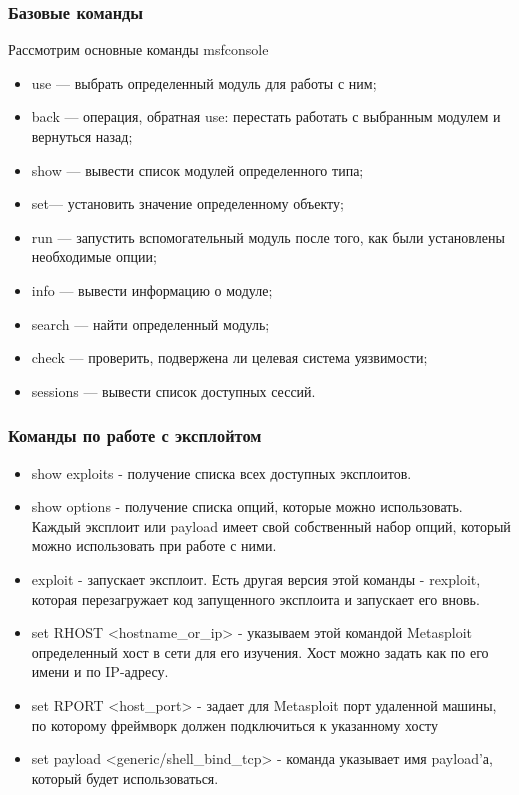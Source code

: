 \documentclass[10pt,a4paper]{article}
\begin{document}
\subsubsection{Базовые команды}
Рассмотрим основные команды msfconsole
\begin{itemize}
\item use — выбрать определенный модуль для работы с ним;
\item back — операция, обратная use: перестать работать с выбранным модулем и вернуться назад;
\item show — вывести список модулей определенного типа;
\item set— установить значение определенному объекту;
\item run — запустить вспомогательный модуль после того, как были установлены необходимые опции;
\item info — вывести информацию о модуле;
\item search — найти определенный модуль;
\item check — проверить, подвержена ли целевая система уязвимости;
\item sessions — вывести список доступных сессий.
\end{itemize}

\subsubsection{Команды по работе с эксплойтом}
\begin{itemize}
\item show exploits - получение списка всех доступных эксплоитов.
\item show options - получение списка опций, которые можно использовать. Каждый эксплоит или payload имеет свой собственный набор опций, который можно использовать при работе с ними.
\item exploit - запускает эксплоит. Есть другая версия этой команды - rexploit, которая перезагружает код запущенного эксплоита и запускает его вновь.
\item set RHOST <hostname\_or\_ip> - указываем этой командой Metasploit определенный хост в сети для его изучения. Хост можно задать как по его имени и по IP-адресу.
\item set RPORT <host\_port> - задает для Metasploit порт удаленной машины, по которому фреймворк должен подключиться к указанному хосту
\item set payload <generic/shell\_bind\_tcp> - команда указывает имя payload’а, который будет использоваться.
\end{itemize}
\end{document}
